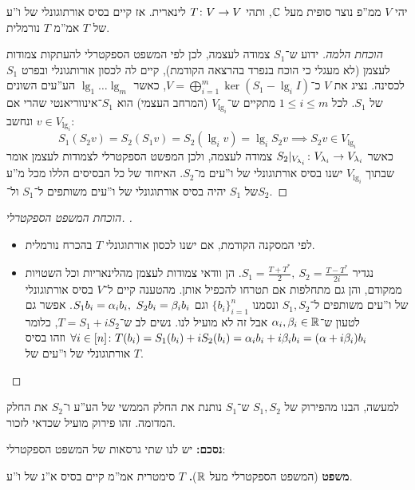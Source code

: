 \documentclass[name=רשימות אלגברה לינארית 2א]{../../../tex/classes/megasumPreamble}
\begin{document}
	\begin{Theorem}
		יהי $V$ ממ''פ נוצר סופית מעל $\mathbb{C}$, ותהי $T \colon V \to V$ לינארית. אז קיים בסיס אורתוגונלי של ו''ע של $T$ אמ''מ $T$ נורמלית. 
	\end{Theorem}
	\begin{proof}[הוכחת הלמה]
		ידוע ש־$S_1$ צמודה לעצמה, לכן לפי המשפט הספקטרלי להעתקות צמודות לעצמן (לא מעגלי כי הוכח בנפרד בהרצאה הקודמת), קיים לה לכסון אורותגונלי ובפרט $S_1$ לכסינה. נציג את $V$ כ־$V = \bigoplus_{i = 1}^{m} \ker(S_1 - \lg_iI)$, כאשר $\lg _1 \dots \lg_m$ הע''עים השונים של $S_1$. לכל $1 \le i \le m$  מתקיים ש־$V_{\lg_i}$ (המרחב העצמי) הוא $S_1$־אינווריאנטי שהרי אם $v \in V_{\lg_i}$ ונחשב: 
		\[ S_1(S_2 v) = S_2(S_1 v) = S_2(\lg_i v) = \lg _i S_2v \implies S_2 v \in V_{\lg_i} \]
		כאשר $S_2|_{V_{\lambda _i}} \colon V_{\lambda_i} \to V_{\lambda_i}$ צמודה לעצמה, ולכן המפשט הספקטרלי לצמודות לעצמן אומר שבתוך $V_{\lg_i}$ ישנו בסיס אורתוגונלי של ו''עים מ־$S_2$. האיחוד של כל הבסיסים הללו מכל מ''ע של $S_1$ יהיה בסיס אורתוגונלי של ו''עים משותפים ל־$S_1$ ול־$S_2$. 
	\end{proof}
	\begin{proof}[הוכחת המשפט הספקטרלי. ]\,
		\begin{itemize}
			\item[$\implies$] לפי המסקנה הקודמת, אם ישנו לכסון אורתוגונלי $T$ בהכרח נורמלית. 
			\item[$\impliedby$] נגדיר $S_1 = \frac{T + T^*}{2}, \ S_2 = \frac{T - T^*}{2i}$. הן וודאי צמודות לעצמן מהלינאריות וכל השטויות ממקודם, והן גם מתחלפות אם תטרחו להכפיל אותן. מהטענה קיים ל־$V$ בסיס אורתוגונלי של ו''עים משותפים ל־$S_1, S_2$ ונסמנו $\{b_i\}^{n}_{i = 1}$ וגם $S_1b_i = \alpha_i b_i, \ S_2b_i= \beta_i b_i$. אפשר גם לטעון ש־$\alpha_i, \beta_i \in \mathbb{R}$ אבל זה לא מועיל לנו. נשים לב ש־$T = S_1 + iS_2$, כלומר $\forall i \in [n] \colon T(b_i) = S_1(b_i) + iS_2(b_i) = \alpha_i b_i + i\beta_i b_i = (\alpha + i\beta_i)b_i$ וזהו בסיס אורתוגונלי של ו''עים של $T$. 
		\end{itemize}\envendproof
	\end{proof}
	
	למעשה, הבנו מהפירוק של $S_1, S_2$ ש־$S_1$ נותנת את החלק הממשי של הע''ע ו־$S_2$ את החלק המדומה. זהו פירוק מועיל שכדאי לזכור. 
	
	\textbf{נסכם: }יש לנו שתי גרסאות של המשפט הספקטרלי: 
	
	\textbf{משפט} (המשפט הספקטרלי מעל $\mathbb{R}$)\textbf{. }{$T$ סימטרית אמ''מ קיים בסיס א''נ של ו''ע. }
	
\end{document}
